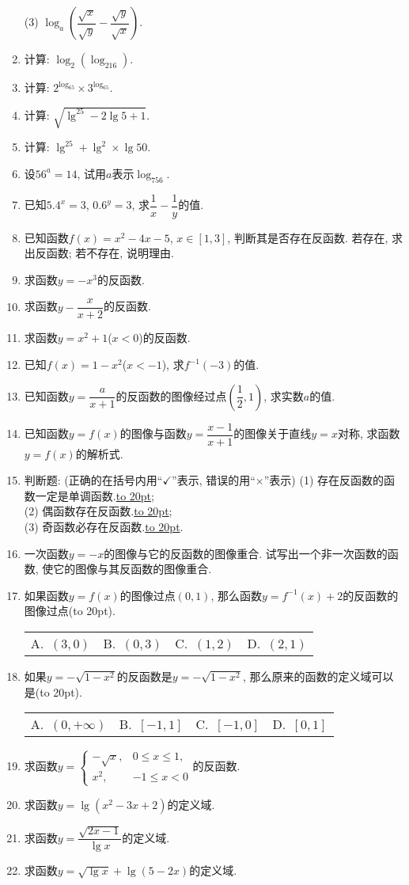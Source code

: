 \documentclass[10pt,a4paper]{article}
\newcommand{\blank}[1]{\underline{\hbox to #1pt{}}}
\newcommand{\bracket}[1]{(\hbox to #1pt{})}
\newcommand{\fourch}[4]{\par\begin{tabular}{p{.23\textwidth}p{.23\textwidth}p{.23\textwidth}p{.23\textwidth}}
A.~#1 &B.~#2& C.~#3& D.~#4
\end{tabular}}
\begin{document}
\begin{enumerate}[1.]
(3) $\log _a(\dfrac{\sqrt x}{\sqrt y}-\dfrac{\sqrt y}{\sqrt x})$.
\item 计算: $\log _2(\log _216)$.
\item 计算: $2^{\log _65}\times 3^{\log _65}$.
\item 计算: $\sqrt {\lg^25-2\lg 5+1}$.
\item 计算: $\lg ^25+\lg ^2\times \lg 50$.
\item 设$56^a=14$, 试用$a$表示$\log _756$.
\item 已知$5.4^x=3$, $0.6^y=3$, 求$\dfrac 1x-\dfrac 1y$的值.
\item 已知函数$f(x)=x^2-4x-5$, $x\in [1,3]$, 判断其是否存在反函数. 若存在, 求出反函数; 若不存在, 说明理由.
\item 求函数$y=-x^3$的反函数.
\item 求函数$y-\dfrac x{x+2}$的反函数.
\item 求函数$y=x^2+1$($x<0$)的反函数.
\item 已知$f(x)=1-x^2$($x<-1$), 求$f^{-1}(-3)$的值.
\item 已知函数$y=\dfrac a{x+1}$的反函数的图像经过点$(\dfrac 12,1)$, 求实数$a$的值.
\item 已知函数$y=f(x)$的图像与函数$y=\dfrac{x-1}{x+1}$的图像关于直线$y=x$对称, 求函数$y=f(x)$的解析式.
\item 判断题: (正确的在括号内用``$\checkmark$''表示, 错误的用``$\times$''表示)
(1) 存在反函数的函数一定是单调函数.\blank{20};\\
(2) 偶函数存在反函数.\blank{20};\\
(3) 奇函数必存在反函数.\blank{20}.
\item 一次函数$y=-x$的图像与它的反函数的图像重合. 试写出一个非一次函数的函数, 使它的图像与其反函数的图像重合.
\item 如果函数$y=f(x)$的图像过点$(0, 1)$, 那么函数$y=f^{-1}(x)+2$的反函数的图像过点\bracket{20}.
\fourch{$(3, 0)$}{$(0, 3)$}{$(1, 2)$}{$(2, 1)$}
\item 如果$y=-\sqrt {1-x^2}$的反函数是$y=-\sqrt {1-x^2}$, 那么原来的函数的定义域可以是\bracket{20}.
\fourch{$(0,+\infty)$}{$[-1,1]$}{$[-1,0]$}{$[0,1]$}
\item 求函数$y=\begin{cases} -\sqrt x, & 0\le x\le 1, \\ x^2, & -1\le x<0 \end{cases}$的反函数.
\item 求函数$y=\lg (x^2-3x+2)$的定义域.
\item 求函数$y=\dfrac{\sqrt {2x-1}}{\lg x}$的定义域.
\item 求函数$y=\sqrt {\lg x}+\lg (5-2x)$的定义域.

\end{enumerate}
\end{document}
